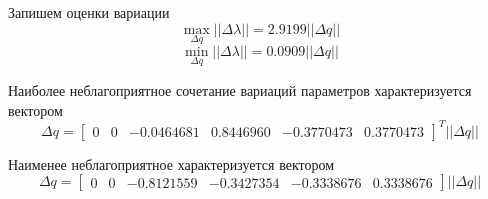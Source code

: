 Запишем оценки вариации
\begin{equation}
\max_{\Delta q} ||\Delta \lambda|| =  2.9199 ||\Delta q||
\end{equation}
\begin{equation}
\min_{\Delta q} ||\Delta \lambda|| = 0.0909 ||\Delta q||
\end{equation}

Наиболее неблагоприятное сочетание вариаций параметров характеризуется вектором
\begin{equation}
	\Delta q = 
	\begin{bmatrix}
	0&0&- 0.0464681 &   0.8446960 & - 0.3770473 &   0.3770473 
	\end{bmatrix}^T
	||\Delta q||
\end{equation}

Наименее неблагоприятное характеризуется вектором
\begin{equation}
	\Delta q = 
	\begin{bmatrix}
		0&0&  - 0.8121559 & - 0.3427354 & - 0.3338676  &  0.3338676 
	\end{bmatrix}
	||\Delta q||
\end{equation}


\newpage
